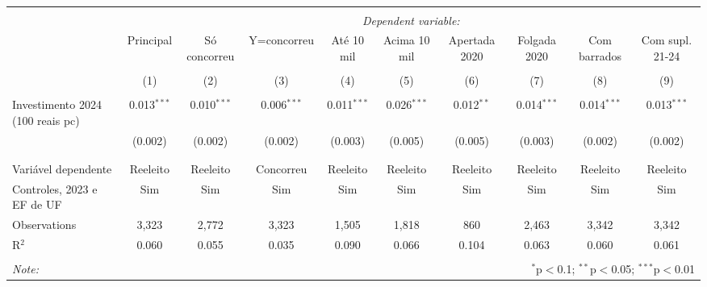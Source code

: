 
\begin{table}[!htbp] \centering 
  \caption{} 
  \label{} 
\begin{tabular}{@{\extracolsep{5pt}}lccccccccc} 
\\[-1.8ex]\hline 
\hline \\[-1.8ex] 
 & \multicolumn{9}{c}{\textit{Dependent variable:}} \\ 
\cline{2-10} 
 & Principal & Só concorreu & Y=concorreu & Até 10 mil & Acima 10 mil & Apertada 2020 & Folgada 2020 & Com barrados & Com supl. 21-24 \\ 
\\[-1.8ex] & (1) & (2) & (3) & (4) & (5) & (6) & (7) & (8) & (9)\\ 
\hline \\[-1.8ex] 
 Investimento 2024 (100 reais pc) & 0.013$^{***}$ & 0.010$^{***}$ & 0.006$^{***}$ & 0.011$^{***}$ & 0.026$^{***}$ & 0.012$^{**}$ & 0.014$^{***}$ & 0.014$^{***}$ & 0.013$^{***}$ \\ 
  & (0.002) & (0.002) & (0.002) & (0.003) & (0.005) & (0.005) & (0.003) & (0.002) & (0.002) \\ 
  & & & & & & & & & \\ 
\hline \\[-1.8ex] 
Variável dependente & Reeleito & Reeleito & Concorreu & Reeleito & Reeleito & Reeleito & Reeleito & Reeleito & Reeleito \\ 
Controles, 2023 e EF de UF & Sim & Sim & Sim & Sim & Sim & Sim & Sim & Sim & Sim \\ 
Observations & 3,323 & 2,772 & 3,323 & 1,505 & 1,818 & 860 & 2,463 & 3,342 & 3,342 \\ 
R$^{2}$ & 0.060 & 0.055 & 0.035 & 0.090 & 0.066 & 0.104 & 0.063 & 0.060 & 0.061 \\ 
\hline 
\hline \\[-1.8ex] 
\textit{Note:}  & \multicolumn{9}{r}{$^{*}$p$<$0.1; $^{**}$p$<$0.05; $^{***}$p$<$0.01} \\ 
\end{tabular} 
\end{table} 
